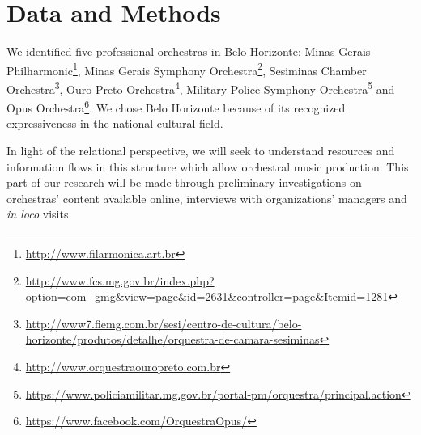 \documentclass[a4paper, 12pt, openright, oneside, german, french, brazil, english, article]{abntex2}
\begin{document}
	
	\section{Data and Methods}
	
	
	
	We identified five professional orchestras in Belo Horizonte: Minas Gerais Philharmonic\footnote{\url{http://www.filarmonica.art.br}}, Minas Gerais Symphony Orchestra\footnote{\url{http://www.fcs.mg.gov.br/index.php?option=com_gmg&view=page&id=2631&controller=page&Itemid=1281}}, Sesiminas Chamber Orchestra\footnote{\url{http://www7.fiemg.com.br/sesi/centro-de-cultura/belo-horizonte/produtos/detalhe/orquestra-de-camara-sesiminas}}, Ouro Preto Orchestra\footnote{\url{http://www.orquestraouropreto.com.br}}, Military Police Symphony Orchestra\footnote{\url{https://www.policiamilitar.mg.gov.br/portal-pm/orquestra/principal.action}} and Opus Orchestra\footnote{\url{https://www.facebook.com/OrquestraOpus/}}. We chose	Belo Horizonte because of its recognized expressiveness in the national cultural field.
	
	
	In light of the relational perspective, we will seek to understand resources and information flows in this structure which allow orchestral music production. This part of our research will be made through preliminary investigations on orchestras' content available online, interviews with organizations' managers and \textit{in loco} visits.
	
\end{document}
